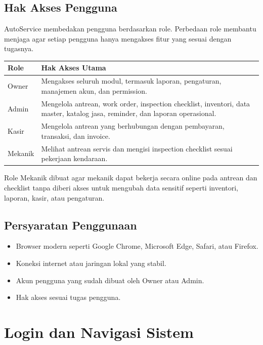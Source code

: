 \documentclass[12pt,a4paper]{report}
\begin{document}
\section{Hak Akses Pengguna}
AutoService membedakan pengguna berdasarkan role. Perbedaan role membantu menjaga agar setiap pengguna hanya mengakses fitur yang sesuai dengan tugasnya.

\begin{longtable}{p{3cm}p{10cm}}
\toprule
\textbf{Role} & \textbf{Hak Akses Utama} \\
\midrule
Owner & Mengakses seluruh modul, termasuk laporan, pengaturan, manajemen akun, dan permission. \\
Admin & Mengelola antrean, work order, inspection checklist, inventori, data master, katalog jasa, reminder, dan laporan operasional. \\
Kasir & Mengelola antrean yang berhubungan dengan pembayaran, transaksi, dan invoice. \\
Mekanik & Melihat antrean servis dan mengisi inspection checklist sesuai pekerjaan kendaraan. \\
\bottomrule
\end{longtable}

\begin{infobox}
Role Mekanik dibuat agar mekanik dapat bekerja secara online pada antrean dan checklist tanpa diberi akses untuk mengubah data sensitif seperti inventori, laporan, kasir, atau pengaturan.
\end{infobox}

\section{Persyaratan Penggunaan}
\begin{itemize}
    \item Browser modern seperti Google Chrome, Microsoft Edge, Safari, atau Firefox.
    \item Koneksi internet atau jaringan lokal yang stabil.
    \item Akun pengguna yang sudah dibuat oleh Owner atau Admin.
    \item Hak akses sesuai tugas pengguna.
\end{itemize}

\chapter{Login dan Navigasi Sistem}
\end{document}
